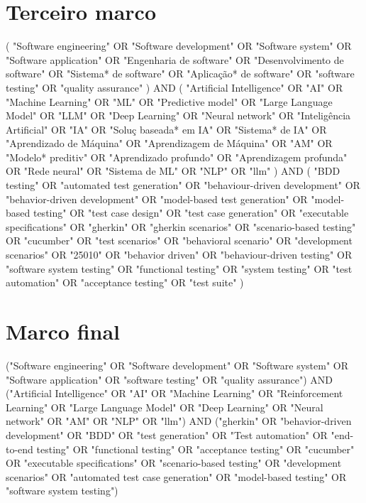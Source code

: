 \begin{apendicesenv}
\section{Terceiro marco}
\label{ap:string-marco-3}
\begingroup
\small\ttfamily
( "Software engineering" OR "Software development" OR "Software system" OR "Software application" OR "Engenharia de software" OR "Desenvolvimento de software" OR "Sistema* de software" OR "Aplicação* de software" OR "software testing" OR "quality assurance" ) AND ( "Artificial Intelligence" OR "AI" OR "Machine Learning" OR "ML" OR "Predictive model" OR "Large Language Model" OR "LLM" OR "Deep Learning" OR "Neural network" OR "Inteligência Artificial" OR "IA" OR "Soluç baseada* em IA" OR "Sistema* de IA" OR "Aprendizado de Máquina" OR "Aprendizagem de Máquina" OR "AM" OR "Modelo* preditiv" OR "Aprendizado profundo" OR "Aprendizagem profunda" OR "Rede neural" OR "Sistema de ML" OR "NLP" OR "llm" ) AND ( "BDD testing" OR "automated test generation" OR "behaviour-driven development" OR "behavior-driven development" OR "model-based test generation" OR "model-based testing" OR "test case design" OR "test case generation" OR "executable specifications" OR "gherkin" OR "gherkin scenarios" OR "scenario-based testing" OR "cucumber" OR "test scenarios" OR "behavioral scenario" OR "development scenarios" OR "25010" OR "behavior driven" OR "behaviour-driven testing" OR "software system testing" OR "functional testing" OR "system testing" OR "test automation" OR "acceptance testing" OR "test suite" )
\par
\endgroup

\section{Marco final}
\label{ap:string-marco-final}
\begingroup
\small\ttfamily
("Software engineering" OR "Software development" OR "Software system" OR "Software application" OR "software testing" OR "quality assurance") AND ("Artificial Intelligence" OR "AI" OR "Machine Learning" OR "Reinforcement Learning" OR "Large Language Model" OR "Deep Learning" OR "Neural network" OR "AM" OR "NLP" OR "llm") AND ("gherkin" OR "behavior-driven development" OR "BDD" OR "test generation" OR "Test automation" OR "end-to-end testing" OR "functional testing" OR "acceptance testing" OR "cucumber" OR "executable specifications" OR "scenario-based testing" OR "development scenarios" OR "automated test case generation" OR "model-based testing" OR "software system testing")
\par
\endgroup

\end{apendicesenv}
